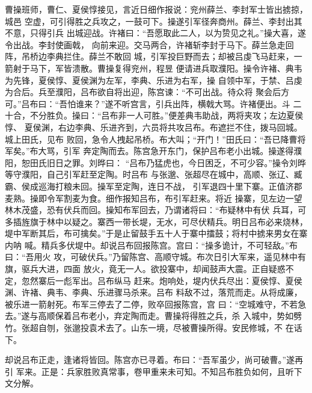 曹操班师，曹仁、夏侯惇接见，言近日细作报说：兖州薛兰、李封军士皆出掳掠，城邑
空虚，可引得胜之兵攻之，一鼓可下。操遂引军径奔商州。薛兰、李封出其不意，只得引兵
出城迎战。许褚曰：“吾愿取此二人，以为贽见之礼。”操大喜，遂令出战。李封使画戟，
向前来迎。交马两合，许褚斩李封于马下。薛兰急走回阵，吊桥边李典拦住。薛兰不敢回
城，引军投巨野而去；却被吕虔飞马赶来，一箭射于马下，军皆溃散。曹操复得兖州，程昱
便请进兵取濮阳。操令许褚、典韦为先锋，夏侯惇、夏侯渊为左军，李典、乐进为右军，操
自领中军，于禁、吕虔为合后。兵至濮阳，吕布欲自将出迎，陈宫谏：“不可出战。待众将
聚会后方可。”吕布曰：“吾怕谁来？”遂不听宫言，引兵出阵，横戟大骂。许褚便出。斗
二十合，不分胜负。操曰：“吕布非一人可胜。”便差典韦助战，两将夹攻；左边夏侯惇、
夏侯渊，右边李典、乐进齐到，六员将共攻吕布。布遮拦不住，拨马回城。城上田氏，见布
败回，急令人拽起吊桥。布大叫；“开门！”田氏曰：“吾已降曹将军矣。”布大骂，引军
奔定陶而去。陈宫急开东门，保护吕布老小出城。操遂得濮阳，恕田氏旧日之罪。刘晔曰：
“吕布乃猛虎也，今日困乏，不可少容。”操令刘晔等守濮阳，自己引军赶至定陶。时吕布
与张邈、张超尽在城中，高顺、张辽、臧霸、侯成巡海打粮未回。操军至定陶，连日不战，
引军退四十里下寨。正值济郡麦熟。操即令军割麦为食。细作报知吕布，布引军赶来。将近
操寨，见左边一望林木茂盛，恐有伏兵而回。操知布军回去，乃谓诸将曰：“布疑林中有伏
兵耳，可多插旌旗于林中以疑之。寨西一带长堤，无水，可尽伏精兵。明日吕布必来烧林，
堤中军断其后，布可擒矣。”于是止留鼓手五十人于寨中擂鼓；将村中掳来男女在寨内呐
喊。精兵多伏堤中。却说吕布回报陈宫。宫曰：“操多诡计，不可轻敌。”布曰：“吾用火
攻，可破伏兵。”乃留陈宫、高顺守城。布次日引大军来，遥见林中有旗，驱兵大进，四面
放火，竟无一人。欲投寨中，却闻鼓声大震。正自疑惑不定，忽然寨后一彪军出。吕布纵马
赶来。炮响处，堤内伏兵尽出：夏侯惇、夏侯渊、许褚、典韦、李典、乐进骤马杀来。吕布
料敌不过，落荒而走。从将成廉，被乐进一箭射死。布军三停去了二停，败卒回报陈宫，宫
曰：“空城难守，不若急去。”遂与高顺保着吕布老小，弃定陶而走。曹操将得胜之兵，杀
入城中，势如劈竹。张超自刎，张邈投袁术去了。山东一境，尽被曹操所得。安民修城，不
在话下。

却说吕布正走，逢诸将皆回。陈宫亦已寻着。布曰：“吾军虽少，尚可破曹。”遂再引
军来。正是：兵家胜败真常事，卷甲重来未可知。不知吕布胜负如何，且听下文分解。